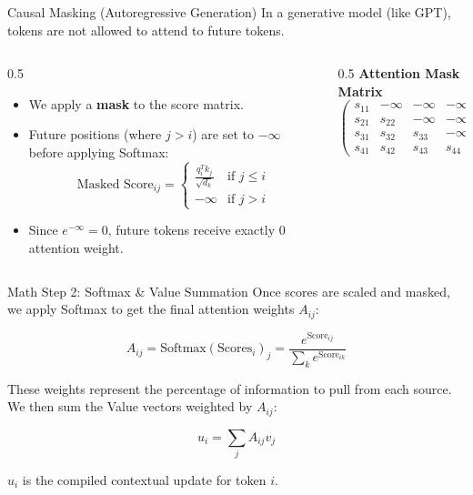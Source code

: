 \documentclass[aspectratio=169]{beamer}
\begin{document}
\begin{frame}{Causal Masking (Autoregressive Generation)}
  In a generative model (like GPT), tokens are not allowed to attend to future tokens.
  
  \begin{columns}
    \begin{column}{0.5\textwidth}
      \begin{itemize}
        \item We apply a \textbf{mask} to the score matrix.
        \item Future positions (where $j > i$) are set to $-\infty$ before applying Softmax:
          \[
          \text{Masked Score}_{ij} = 
          \begin{cases} 
            \frac{q_i^T k_j}{\sqrt{d_k}} & \text{if } j \le i \\
            -\infty & \text{if } j > i
          \end{cases}
          \]
        \item Since $e^{-\infty} = 0$, future tokens receive exactly 0 attention weight.
      \end{itemize}
    \end{column}
    
    \begin{column}{0.5\textwidth}
      \centering
      \textbf{Attention Mask Matrix}
      \[
      \begin{pmatrix}
        s_{11} & -\infty & -\infty & -\infty \\
        s_{21} & s_{22} & -\infty & -\infty \\
        s_{31} & s_{32} & s_{33} & -\infty \\
        s_{41} & s_{42} & s_{43} & s_{44}
      \end{pmatrix}
      \]
    \end{column}
  \end{columns}
\end{frame}

\begin{frame}{Math Step 2: Softmax & Value Summation}
  Once scores are scaled and masked, we apply Softmax to get the final attention weights $A_{ij}$:
  
  \[
  A_{ij} = \text{Softmax}\left( \text{Scores}_i \right)_j = \frac{e^{\text{Score}_{ij}}}{\sum_k e^{\text{Score}_{ik}}}
  \]
  
  These weights represent the percentage of information to pull from each source.
  We then sum the Value vectors weighted by $A_{ij}$:
  
  \[
  u_i = \sum_{j} A_{ij} v_j
  \]
  
  $u_i$ is the compiled contextual update for token $i$.
\end{frame}
\end{document}
